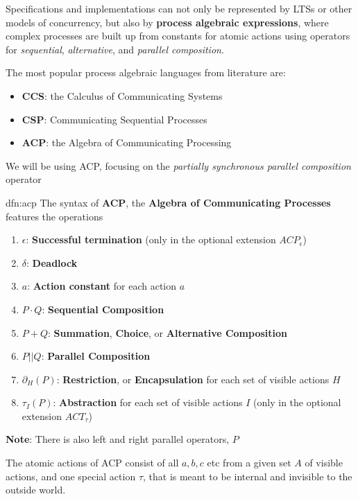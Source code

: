 \documentclass{article}
\begin{document}
Specifications and implementations can not only be represented by LTSs or other models of concurrency, but also by \textbf{process algebraic expressions}, where complex processes are built up from constants for atomic actions using operators for \textit{sequential}, \textit{alternative}, and \textit{parallel composition}.

The most popular process algebraic languages from literature are:
\begin{itemize}
    \item \textbf{CCS}: the Calculus of Communicating Systems
    \item \textbf{CSP}: Communicating Sequential Processes
    \item \textbf{ACP}: the Algebra of Communicating Processing
\end{itemize}

We will be using ACP, focusing on the \textit{partially synchronous parallel composition} operator

\newpage
\begin{dfn}[ACP]{dfn:acp}{}
    The syntax of \textbf{ACP}, the \textbf{Algebra of Communicating Processes} features the operations
    \begin{enumerate}
        \item $\epsilon$: \textbf{Successful termination} (only in the optional extension $ACP_{\epsilon}$)
        \item $\delta$: \textbf{Deadlock}
        \item $a$: \textbf{Action constant} for each action $a$
        \item $P\cdot Q$: \textbf{Sequential Composition}
        \item $P + Q$: \textbf{Summation}, \textbf{Choice}, or \textbf{Alternative Composition}
        \item $P | | Q$: \textbf{Parallel Composition}
        \item $\partial_H(P)$: \textbf{Restriction}, or \textbf{Encapsulation} for each set of visible actions $H$
        \item $\tau_{I}(P)$: \textbf{Abstraction} for each set of visible actions $I$ (only in the optional extension $ACT_{\tau}$)
    \end{enumerate}
\end{dfn}

\textbf{Note}: There is also left and right parallel operators, $P $

The atomic actions of ACP consist of all $a,b,c$ etc from a given set $A$ of visible actions, and one special action $\tau$, that is meant to be internal and invisible to the outside world.
\end{document}
